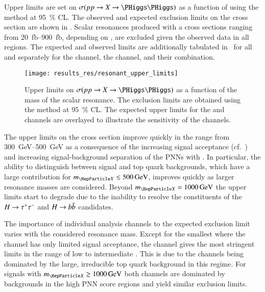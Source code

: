 Upper limits are set on $\sigma(pp \to X \to \HH)$ as a function of \mX using
the \CLs method at \SI{95}{\percent} CL. The observed and expected exclusion
limits on the cross section are shown in . Scalar
resonances produced with a cross sections ranging from
\SIrange{20}{900}{\femto\barn}, depending on \mX, are excluded given the
observed data in all regions. The expected and observed limits are additionally
tabulated in~ for all \mX and separately for the \hadhad
channel, the \lephad channel, and their combination.

\begin{figure}[htbp]
  \centering

  \texttt{[image: results\_res/resonant\_upper\_limits]}

  \caption{Upper limits on $\sigma(pp \to X \to \HH)$ as a function of the mass
    of the scalar resonance. The exclusion limits are obtained using the \CLs
    method at \SI{95}{\percent} CL. The expected upper limits for the \hadhad
    and \lephad channels are overlayed to illustrate the sensitivity of the
    channels.}%
  \label{fig:res_upper_limits}
\end{figure}

The upper limits on the cross section improve quickly in the \mX range from
\SIrange{300}{500}{\GeV} as a consequence of the increasing signal acceptance
(cf.~) and increasing signal-background
separation of the PNNs with \mX. In particular, the ability to distinguish
between signal and top quark backgrounds, which have a large contribution for
$\mX \lesssim \SI{500}{\GeV}$, improves quickly as larger resonance masses are
considered. Beyond $\mX = \SI{1000}{\GeV}$ the upper limits start to degrade due
to the inability to resolve the constituents of the $H \to \tau^{+} \tau^{-}$ and
$H \to b\bar{b}$ candidates.



The importance of individual analysis channels to the expected exclusion limit
varies with the considered resonance mass. Except for the smallest \mX where the
\hadhad channel has only limited signal acceptance, the \hadhad channel gives
the most stringent limits in the range of low to intermediate \mX. This is due
to the \lephad channels being dominated by the large, irreducible top quark
background in this regime. For signals with $\mX \gtrsim \SI{1000}{\GeV}$ both
channels are dominated by \Zjets backgrounds in the high PNN score regions and
yield similar exclusion limits.

